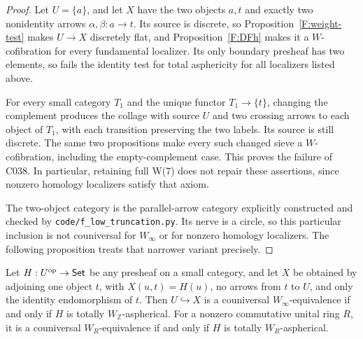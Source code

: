 \begin{proof}
Let $U=\{a\}$, and let $X$ have the two objects
$a,t$ and exactly two nonidentity arrows
$\alpha,\beta:a\to t$. Its source is discrete,
so Proposition~\ref{F:weight-test} makes $U\to X$
discretely flat, and Proposition~\ref{F:DFh}
makes it a $W$-cofibration for every fundamental
localizer. Its only boundary presheaf has two
elements, so fails the identity test for total
asphericity for all localizers listed above.

For every small category $T_1$ and the unique
functor $T_1\to\{t\}$, changing the complement
produces the collage with source $U$ and two
crossing arrows to each object of $T_1$, with
each transition preserving the two labels.
Its source is still discrete. The same two
propositions make every such changed sieve a
$W$-cofibration, including the empty-complement
case. This proves the failure of C038. In
particular, retaining full W(7) does not repair
these assertions, since nonzero homology
localizers satisfy that axiom.

The two-object category is the parallel-arrow
category explicitly constructed and checked by
\texttt{code/f\_low\_truncation.py}. Its nerve
is a circle, so this particular inclusion is
not couniversal for $W_\infty$ or for nonzero
homology localizers. The following proposition
treats that narrower variant precisely.
\end{proof}

\begin{proposition}\label{F:onepoint-couniversal}
Let $H:U^{\mathrm{op}}\to\mathsf{Set}$ be any presheaf on a small
category, and let $X$ be obtained by adjoining one
object $t$, with $X(u,t)=H(u)$, no arrows from
$t$ to $U$, and only the identity endomorphism
of $t$. Then $U\hookrightarrow X$ is a
couniversal $W_\infty$-equivalence if and only
if $H$ is totally $W_{\mathbb Z}$-aspherical.
For a nonzero commutative unital ring $R$, it
is a couniversal $W_R$-equivalence if and only
if $H$ is totally $W_R$-aspherical.
\end{proposition}

